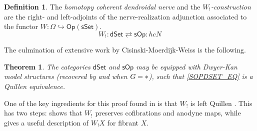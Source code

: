 \documentclass[a4paper,10pt
,draft
]{article}%
\numberwithin{equation}{section}
\numberwithin{figure}{section}
\newtheorem{theorem}[equation]{Theorem}%
\theoremstyle{definition} %
\newtheorem{definition}[equation]{Definition}%
\newcommand{\into}{\hookrightarrow}%
\newcommand{\sSet}{\ensuremath{\mathsf{sSet}}}%
\newcommand{\Op}{\mathsf{Op}}%
\newcommand{\sOp}{\ensuremath{\mathsf{sOp}}}%
\newcommand{\dSet}{\mathsf{dSet}}
\newcommand{\1}{\ensuremath{\mathbbm 1}}%
\begin{document}
\begin{definition}
      The \textit{homotopy coherent dendroidal nerve} and the \textit{$W_!$-construction}
      are the right- and left-adjoints of the nerve-realization adjunction associated to the functor $W: \Omega \into \Op(\sSet)$.
      \begin{equation}
            \label{SOPDSET_EQ}
            W_! \colon \dSet \rightleftarrows \sOp \colon h c N
      \end{equation}
\end{definition}


The culmination of extensive work by Cisinski-Moerdijk-Weiss \cite{CM13a,CM13b,CM11,MW09,MW07} is the following.

\begin{theorem}
      \label{CMW_THM}
      The categories $\dSet$ and $\sOp$ may be equipped with Dwyer-Kan model structures
      (recovered by \cite[Thm. 2.1]{Per18} and \cite[Thm III]{BP_HGOP}  when $G = \**$),
      such that \eqref{SOPDSET_EQ} is a Quillen equivalence.
\end{theorem}


One of the key ingredients for this proof found in \cite{CM13b} is that $W_!$ is left Quillen \cite[Prop. 4.9]{CM13b}.
This has two steps:
\cite[Prop. 4.5]{CM13b} shows that $W_!$ preserves cofibrations and anodyne maps,
while \cite[Prop. 4.8]{CM13b} gives a useful description of $W_!X$ for fibrant $X$.
\end{document}
